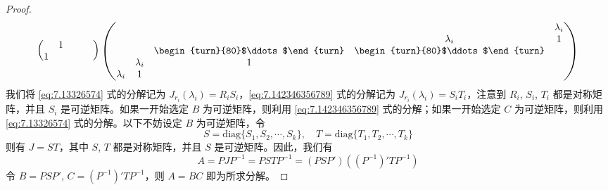 \documentclass[../../main.tex]{subfiles}%
\begin{document}
\begin{proof}
\begin{align}
\begin{pmatrix}
& 1 & & & \\
1 & & & &
\end{pmatrix}
\begin{pmatrix}
& & & & \lambda_i \\
& & & \lambda_i & 1 \\
& & \begin{turn}{80}$\ddots$\end{turn} & \begin{turn}{80}$\ddots$\end{turn} & \\
& \lambda_i & 1 & & \\
\lambda_i & 1 & & &
\end{pmatrix}
\label{eq:7.142346356789}
\end{align}
我们将 \eqref{eq:7.13326574} 式的分解记为 $J_{r_i}(\lambda_i) = R_iS_i$，\eqref{eq:7.142346356789} 式的分解记为 $J_{r_i}(\lambda_i) = S_iT_i$，注意到 $R_i$, $S_i$, $T_i$ 都是对称矩阵，并且 $S_i$ 是可逆矩阵。如果一开始选定 $B$ 为可逆矩阵，则利用 \eqref{eq:7.142346356789} 式的分解；如果一开始选定 $C$ 为可逆矩阵，则利用 \eqref{eq:7.13326574} 式的分解。以下不妨设定 $B$ 为可逆矩阵，令
\[
S = \mathrm{diag}\{S_1,S_2,\cdots,S_k\}, \quad T = \mathrm{diag}\{T_1,T_2,\cdots,T_k\}
\]
则有 $J = ST$，其中 $S$, $T$ 都是对称矩阵，并且 $S$ 是可逆矩阵。因此，我们有
\[
A = PJP^{-1} = PSTP^{-1} = (PSP')((P^{-1})'TP^{-1})
\]
令 $B = PSP'$, $C = (P^{-1})'TP^{-1}$，则 $A = BC$ 即为所求分解。
\end{proof}
\end{document}
